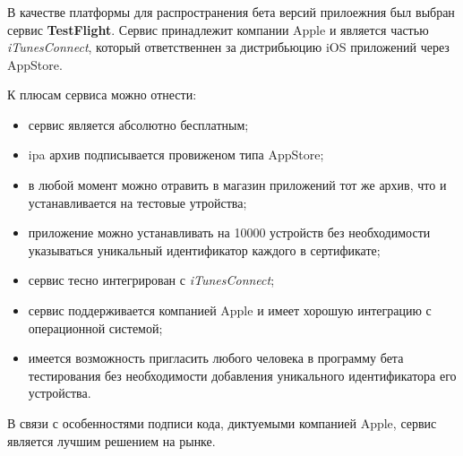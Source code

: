 \subsubsection{}
\label{sec:testing:ci:testflight}

В качестве платформы для распространения бета версий прилоежния был выбран сервис \textbf{TestFlight}. Сервис принадлежит компании Apple и является частью \textit{iTunesConnect}, который ответственнен за дистрибьюцию iOS приложений через AppStore.

К плюсам сервиса можно отнести:

\begin{itemize}
	\item сервис является абсолютно бесплатным;
	\item ipa архив подписывается провиженом типа AppStore;
	\item в любой момент можно отравить в магазин приложений тот же архив, что и устанавливается на тестовые утройства;
	\item приложение можно устанавливать на \num{10000} устройств без необходимости указываться уникальный идентификатор каждого в сертификате;
	\item сервис тесно интегрирован с \textit{iTunesConnect};
	\item сервис поддерживается компанией Apple и имеет хорошую интеграцию с операционной системой;
	\item имеется возможность пригласить любого человека в программу бета тестирования без необходимости добавления уникального идентификатора его устройства.
\end{itemize}

В связи с особенностями подписи кода, диктуемыми компанией Apple, сервис является лучшим решением на рынке.

